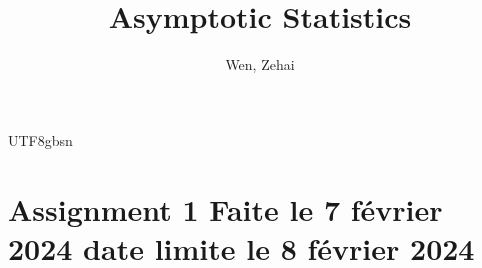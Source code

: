 \documentclass[12pt]{report}
\title{Asymptotic Statistics}
\author{Wen, Zehai}
\date{\DTMnow}
\theoremstyle{plain}
\theoremstyle{definition}
\begin{document}
\begin{CJK*}{UTF8}{gbsn}
\maketitle

\setcounter{tocdepth}{0}
\tableofcontents

\chapter{Assignment 1 Faite le 7 février 2024 date limite le 8 février 2024}


%

%

%

\end{CJK*}
\end{document}
